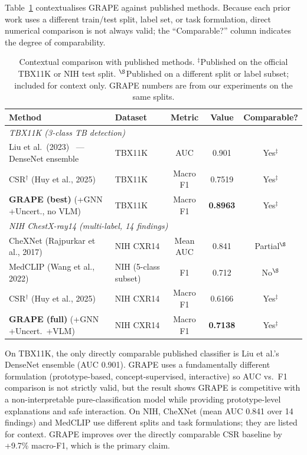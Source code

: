 \documentclass{article}
\begin{document}
Table~\ref{tab:sota} contextualises GRAPE against published methods.
Because each prior work uses a different train/test split, label set, or task formulation, direct numerical comparison is not always valid; the ``Comparable?'' column indicates the degree of comparability.

\begin{table}[t]
  \caption{Contextual comparison with published methods. $^\ddagger$Published on the official TBX11K or NIH test split.
  $^\S$Published on a different split or label subset; included for context only.
  GRAPE numbers are from our experiments on the same splits.}
  \label{tab:sota}
  \centering
  \begin{tabular}{llccc}
    \toprule
    Method & Dataset & Metric & Value & Comparable? \\
    \midrule
    \multicolumn{5}{l}{\textit{TBX11K (3-class TB detection)}} \\
    Liu et al.\ (2023)~\cite{chen2020tbx11k} — DenseNet ensemble & TBX11K & AUC & 0.901 & Yes$^\ddagger$ \\
    CSR$^\dagger$ (Huy et al., 2025)~\cite{csr2025}             & TBX11K & Macro F1 & 0.7519 & Yes$^\ddagger$ \\
    \textbf{GRAPE (best)} (+GNN +Uncert., no VLM)                & TBX11K & Macro F1 & \textbf{0.8963} & Yes$^\ddagger$ \\
    \midrule
    \multicolumn{5}{l}{\textit{NIH ChestX-ray14 (multi-label, 14 findings)}} \\
    CheXNet (Rajpurkar et al., 2017)~\cite{rajpurkar2017chexnet} & NIH CXR14 & Mean AUC & 0.841 & Partial$^\S$ \\
    MedCLIP (Wang et al., 2022)~\cite{wang2022medclip}           & NIH (5-class subset) & F1 & 0.712 & No$^\S$ \\
    CSR$^\dagger$ (Huy et al., 2025)~\cite{csr2025}              & NIH CXR14 & Macro F1 & 0.6166 & Yes$^\ddagger$ \\
    \textbf{GRAPE (full)} (+GNN +Uncert.\ +VLM)                  & NIH CXR14 & Macro F1 & \textbf{0.7138} & Yes$^\ddagger$ \\
    \bottomrule
  \end{tabular}
\end{table}

On TBX11K, the only directly comparable published classifier is Liu et al.'s DenseNet ensemble (AUC 0.901).
GRAPE uses a fundamentally different formulation (prototype-based, concept-supervised, interactive) so AUC vs.\ F1 comparison is not strictly valid, but the result shows GRAPE is competitive with a non-interpretable pure-classification model while providing prototype-level explanations and safe interaction.
On NIH, CheXNet (mean AUC 0.841 over 14 findings) and MedCLIP use different splits and task formulations; they are listed for context.
GRAPE improves over the directly comparable CSR baseline by +9.7\% macro-F1, which is the primary claim.
\end{document}
